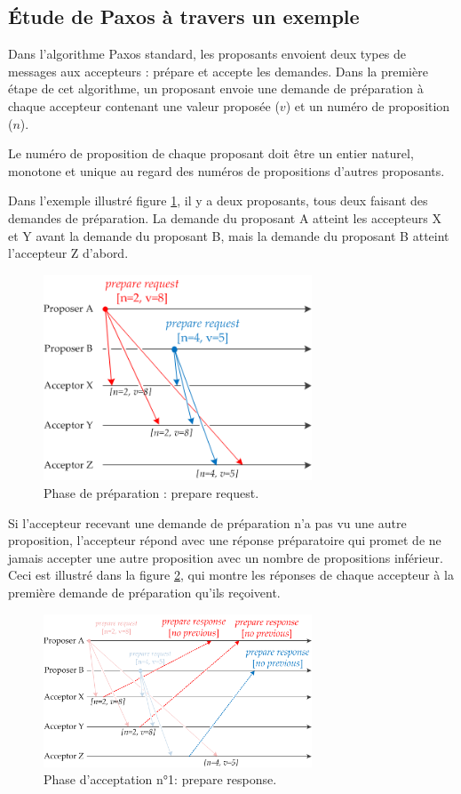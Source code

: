 \subsection{Étude de Paxos à travers un exemple}

Dans l'algorithme Paxos standard, les proposants envoient deux types de messages aux accepteurs : \og{}prépare\fg{} et \og{}accepte\fg{} les demandes. Dans la première étape de cet algorithme, un proposant envoie une demande de préparation à chaque accepteur contenant une valeur proposée ($v$) et un numéro de proposition ($n$). 

Le numéro de proposition de chaque proposant doit être un entier naturel, monotone et unique au regard des numéros de propositions d'autres proposants.

Dans l'exemple illustré figure \ref{chap2:paxos_ex1}, il y a deux proposants, tous deux faisant des demandes de préparation. La demande du proposant A atteint les accepteurs X et Y avant la demande du proposant B, mais la demande du proposant B atteint l'accepteur Z d'abord.

\begin{figure}[H]
    \centering
    \includegraphics[width=8cm]{./images/paxos_ex1.png}
    \caption{Phase de préparation : prepare request.}
    \label{chap2:paxos_ex1}
\end{figure}

Si l'accepteur recevant une demande de préparation n'a pas vu une autre proposition, l'accepteur répond avec une réponse préparatoire qui promet de ne jamais accepter une autre proposition avec un nombre de propositions inférieur. Ceci est illustré dans la figure \ref{chap2:paxos_ex2}, qui montre les réponses de chaque accepteur à la première demande de préparation qu'ils reçoivent.

\begin{figure}[H]
    \centering
    \includegraphics[width=8cm]{./images/paxos_ex2.png}
    \caption{Phase d'acceptation n°1: prepare response.}
    \label{chap2:paxos_ex2}
\end{figure}

